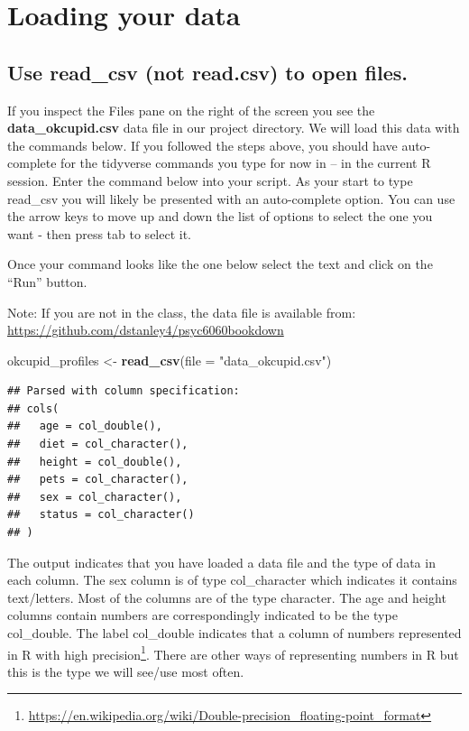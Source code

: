\documentclass[
]{krantz}
\makeatletter
\newenvironment{Shaded}{\begin{snugshade}}{\end{snugshade}}
\newcommand{\DataTypeTok}[1]{\textcolor[rgb]{0.27,0.27,0.27}{#1}}
\newcommand{\KeywordTok}[1]{\textcolor[rgb]{0.27,0.27,0.27}{\textbf{#1}}}
\newcommand{\NormalTok}[1]{#1}
\newcommand{\StringTok}[1]{\textcolor[rgb]{0.5,0.5,0.5}{#1}}
\renewcommand{\href}[2]{#2\footnote{\url{#1}}}
\newenvironment{kframe}{%
\medskip{}
\setlength{\fboxsep}{.8em}
 \def\at@end@of@kframe{}%
 \ifinner\ifhmode%
  \def\at@end@of@kframe{\end{minipage}}%
  \begin{minipage}{\columnwidth}%
 \fi\fi%
 \def\FrameCommand##1{\hskip\@totalleftmargin \hskip-\fboxsep
 \colorbox{shadecolor}{##1}\hskip-\fboxsep
     \hskip-\linewidth \hskip-\@totalleftmargin \hskip\columnwidth}%
 \MakeFramed {\advance\hsize-\width
   \@totalleftmargin\z@ \linewidth\hsize
   \@setminipage}}%
 {\par\unskip\endMakeFramed%
 \at@end@of@kframe}
\renewenvironment{Shaded}{\begin{kframe}}{\end{kframe}}
\makeatother
\begin{document}
\hypertarget{loading-your-data}{%
\section{Loading your data}\label{loading-your-data}}

\hypertarget{use-read_csv-not-read.csv-to-open-files.}{%
\subsection{Use read\_csv (not read.csv) to open files.}\label{use-read_csv-not-read.csv-to-open-files.}}

If you inspect the Files pane on the right of the screen you see the \textbf{data\_okcupid.csv} data file in our project directory. We will load this data with the commands below. If you followed the steps above, you should have auto-complete for the tidyverse commands you type for now in -- in the current R session. Enter the command below into your script. As your start to type read\_csv you will likely be presented with an auto-complete option. You can use the arrow keys to move up and down the list of options to select the one you want - then press tab to select it.

Once your command looks like the one below select the text and click on the ``Run'' button.

Note: If you are not in the class, the data file is available from: \url{https://github.com/dstanley4/psyc6060bookdown}

\begin{Shaded}
\begin{Highlighting}[]
\NormalTok{okcupid_profiles <-}\StringTok{ }\KeywordTok{read_csv}\NormalTok{(}\DataTypeTok{file =} \StringTok{"data_okcupid.csv"}\NormalTok{)}
\end{Highlighting}
\end{Shaded}

\begin{verbatim}
## Parsed with column specification:
## cols(
##   age = col_double(),
##   diet = col_character(),
##   height = col_double(),
##   pets = col_character(),
##   sex = col_character(),
##   status = col_character()
## )
\end{verbatim}

The output indicates that you have loaded a data file and the type of data in each column. The sex column is of type col\_character which indicates it contains text/letters. Most of the columns are of the type character. The age and height columns contain numbers are correspondingly indicated to be the type col\_double. The label col\_double indicates that a column of numbers represented in R with \href{https://en.wikipedia.org/wiki/Double-precision_floating-point_format}{high precision}. There are other ways of representing numbers in R but this is the type we will see/use most often.
\end{document}

